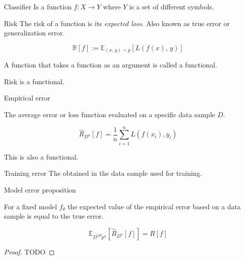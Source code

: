 \begin{definition}{Classifier}{}
	Is a function \(f: X \longrightarrow Y\)
	where \(Y\) is a set of different symbols.
\end{definition}

\begin{definition}{Risk}{}
	The risk of a function is its \emph{expected loss}. Also known as true
	error or generalization error.

	\begin{equation*}
		\mathds{R}[f] := \mathds{E}_{(x,\, y) \sim p} \left[ L(f(x),\, y) \right]
	\end{equation*}

  \tcblower{}
	\begin{note}
		A function that takes a function as an argument is called a functional.

    Risk is a functional. 
	\end{note}
\end{definition}

\begin{definition}{Empirical error}{}

	The average error or loss function evaluated on a specific data sample
	\(D\).

	\begin{equation*}
		\hat{R}_{D^n}[f] = \frac{1}{n} \sum_{i=1}^n L(f(x_i), y_i)
	\end{equation*}

  \tcblower{}
	\begin{note}
		This is also a functional.
	\end{note}
\end{definition}

\begin{definition}{Training error}{}
	The  obtained in the data
	sample used for training.
\end{definition}

\begin{prop}{Model error proposition}{}

	For a fixed model \(f_θ\) the expected value of the
	empirical error based on a data sample is equal to the true error.

	\begin{equation*}
		\mathds{E}_{D^{ijd}p^n}[\hat{R}_{D^n}[f]] = R[f]
	\end{equation*}

  \tcblower
	\begin{proof} TODO
	\end{proof}
\end{prop}


